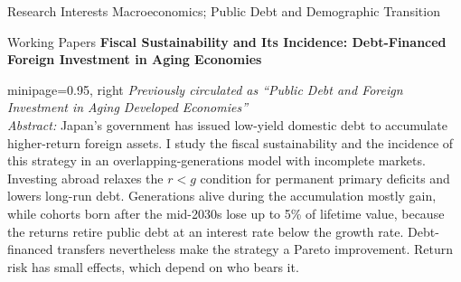 \documentclass{cv} %
\begin{document}
\begin{rSection}{Research Interests}
Macroeconomics; Public Debt and Demographic Transition
\end{rSection}
\bigskip
\begin{rSection}{Working Papers}
\medskip
{\bf Fiscal Sustainability and Its Incidence: Debt-Financed Foreign Investment in Aging Economies} \\
\begin{adjustbox}{minipage=0.95\textwidth, right}
	\vspace{0.3em} \emph{Previously circulated as ``Public Debt and Foreign Investment in Aging Developed Economies''} \\
	{\emph{Abstract:} Japan's government has issued low-yield domestic debt to accumulate higher-return foreign assets. I study the fiscal sustainability and the incidence of this strategy in an overlapping-generations model with incomplete markets. Investing abroad relaxes the $r<g$ condition for permanent primary deficits and lowers long-run debt. Generations alive during the accumulation mostly gain, while cohorts born after the mid-2030s lose up to 5\% of lifetime value, because the returns retire public debt at an interest rate below the growth rate. Debt-financed transfers nevertheless make the strategy a Pareto improvement. Return risk has small effects, which depend on who bears it.}
\end{adjustbox}


\end{rSection}
\end{document}
